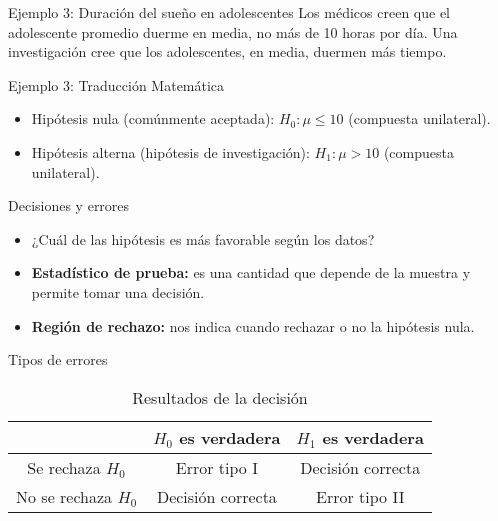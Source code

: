\documentclass[aspectratio=169]{beamer}
\begin{document}
\begin{frame}{Ejemplo 3: Duración del sueño en adolescentes}
    Los médicos creen que el adolescente promedio duerme en media, no más de 10 horas por día. Una investigación cree que los adolescentes, en media, duermen más tiempo.
\end{frame}

\begin{frame}{Ejemplo 3: Traducción Matemática}
    \begin{itemize}
        \item Hipótesis nula (comúnmente aceptada): \( H_0: \mu \leq 10 \) (compuesta unilateral).
        \item Hipótesis alterna (hipótesis de investigación): \( H_1: \mu > 10 \) (compuesta unilateral).
    \end{itemize}
\end{frame}




\begin{frame}{Decisiones y errores}
    \begin{itemize}
        \item ¿Cuál de las hipótesis es más favorable según los datos?
        \item {\bf Estadístico de prueba:} es una cantidad que depende de la muestra y permite tomar una decisión.
        \item {\bf Región de rechazo:} nos indica cuando rechazar o no la hipótesis nula.
    \end{itemize}
\end{frame}


\begin{frame}{Tipos de errores}
    \begin{table}
        \centering
        \begin{tabular}{|c|c|c|}
            \hline
            & \( H_0 \) es verdadera & \( H_1 \) es verdadera \\
            \hline
            Se rechaza \( H_0 \) & Error tipo I & Decisión correcta \\
            \hline
            No se rechaza \( H_0 \) & Decisión correcta & Error tipo II \\
            \hline
        \end{tabular}
        \caption{Resultados de la decisión}
    \end{table}
\end{frame}
\end{document}
